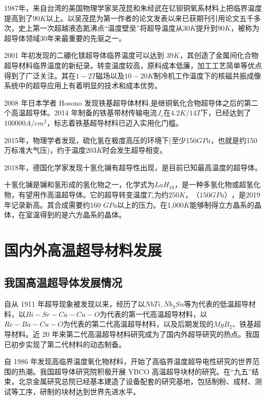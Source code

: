 \documentclass[UTF8, twocolumn]{ctexart}
\begin{document}
    1987年，来自台湾的美国物理学家吴茂昆和朱经武在钇钡铜氧系材料上把临界温度提高到了$90K$以上。以吴茂昆为第一作者的论文\cite{PhysRevLett.58.908}发表以来已获期刊引用论文五千多次，史上第一次超越液态氮沸点“温度壁垒”将超导温度从$30K$提升到$90K$，被称为超导体领域30年来最重要的先驱之一。

    2001 年初发现的二硼化镁超导体\cite{nagamatsu2001superconductivity}临界温度可以达到 $39K$，其创造了金属间化合物超导材料临界温度的新纪录。转变温度较高，原料成本低廉，加工工艺简单等优点得到了广泛关注。其在$1-2T$磁场以及$10-20K$制冷机工作温度下的核磁共振成像系统中的超导应用上有着明显的技术和成本优势。

    2008 年日本学者 Hosono 发现铁基超导体材料\cite{kamihara2008iron},是继铜氧化合物超导体之后的第二个高温超导体。2014 年制备的铁基带材传输电流$J_c$在$4.2K/14T$下，已经达到了$100000A/cm^2$，标志着铁基超导材料已迈入实用化门槛。

    2015年，物理学者发现，硫化氢在极度高压的环境下(至少150$GPa$，也就是约150万标准大气压)，约于温度203$K$时会发生超导相变\cite{drozdov2015conventional}。

    2018年，德国化学家发现十氢化镧有超导性出现，是目前已知最高温度的超导体。

    十氢化镧是镧和氢形成的氢化物之一，化学式为$LaH_{10}$，是一种多氢化物或超氢化物，有望用作高温超导体。它的超导转变温度$T_c$为约$250 K$，$（150 GPa）$，是2019年记录新高。其合成需要约160 $GPa$以上的压力。在1,000$ K$能够制得立方晶系的晶体，在室温得到的是六方晶系的晶体\cite{drozdov2019superconductivity}。

\section{国内外高温超导材料发展}
    
    \subsection{我国高温超导体发展情况}

    自从 1911 年超导现象被发现以来，经历了以$NbTi,Nb_3 Sn$等为代表的低温超导材料，以$Bi-Sr-Ca-Cu-O$为代表的第一代高温超导材料，以$Re-Ba-Cu-O$为代表的第二代高温超导材料，以及后期发现的$MgB_2$、铁基超导材料\cite{金之俭2018二代高温超导材料的应用技术与发展综述}。近 20 年来第二代高温超导材料研究成为了国内外超导研究的热点。我国已初步实现了第二代材料的动态制备\cite{杨天信2008我国高温超导技术研究现状}。

    自 1986 年发现高临界温度氧化物材料，开始了高临界温度超导电性研究的世界范围的热潮。我国超导体研究院积极开展 YBCO 高温超导块材的研究。在“九五”结束，北京金属研究总院已经基本建造了设备配套的研究基地，包括制粉、成材、测试等工序，研制的块材达到世界先进水平\cite{林良真2005我国超导技术研究进展及展望}。
\end{document}
